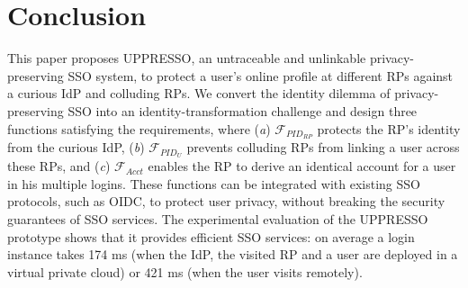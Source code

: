 \section{Conclusion}
\label{sec:conclusion}
This paper proposes UPPRESSO, an untraceable and unlinkable privacy-preserving SSO system,
 to protect a user's online profile at different RPs against a curious IdP and colluding RPs.
We convert the identity dilemma of privacy-preserving SSO into an identity-transformation challenge
 and design three functions satisfying the requirements,
 where (\emph{a}) $\mathcal{F}_{PID_{RP}}$ protects the RP's identity from the curious IdP,
(\emph{b})  $\mathcal{F}_{PID_{U}}$ prevents colluding RPs from linking a user across these RPs,
 and (\emph{c}) $\mathcal{F}_{Acct}$ enables the RP to derive an identical account for a user in his multiple logins.
These functions can be integrated with existing SSO protocols,
    such as OIDC,
    to protect user privacy,
    without breaking the security guarantees of SSO services.
The experimental evaluation of the UPPRESSO prototype shows
 that it provides efficient SSO services:
  on average a login instance takes 174 ms (when the IdP, the visited RP and a user are deployed in a virtual private cloud) or 421 ms (when the user visits remotely).



\newpage
